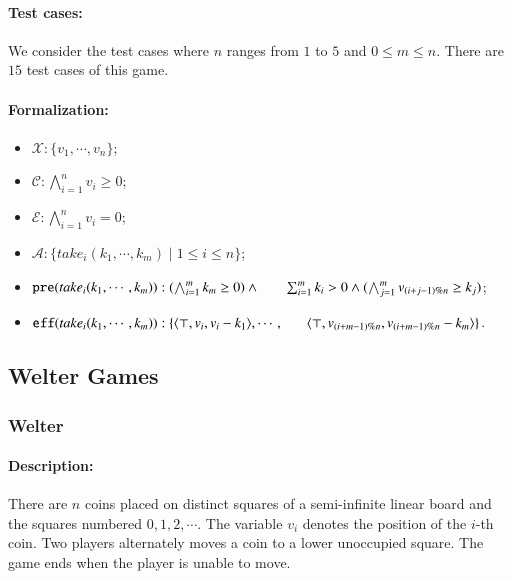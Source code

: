 \documentclass[review]{elsarticle}
\newcommand{\set}[1]{\{ #1 \}}
\newcommand{\tuple}[1]{\langle {#1} \rangle}
\newcommand{\true}{\top}
\newcommand{\statevar}{\mathcal{X}}
\newcommand{\act}{\mathcal{A}}
\newcommand{\constraint}{\mathcal{C}}
\newcommand{\estate}{\mathcal{E}}
\newcommand{\pre}{\mathtt{pre}}
\newcommand{\eff}{\mathtt{eff}}
\begin{document}
\paragraph{Test cases:}
We consider the test cases where $n$ ranges from $1$ to $5$ and $0 \le m \leq n$.
There are $15$ test cases of this game.

\paragraph{Formalization:}
\begin{itemize}
	\item $\statevar: \set{v_1, \cdots, v_n}$;
	\item $\constraint: \bigwedge_{i=1}^{n} v_i \ge 0$;
	\item $\estate: \bigwedge_{i=1}^{n} v_i = 0$;
	\item $\act:\set{take_i(k_1, \cdots, k_m) {\mid} 1 \le i \le n}$;
	\item $\pre(take_i(k_1, \cdots, k_m)) : (\bigwedge_{i=1}^{m} k_m\ge 0) \wedge \\ \hspace*{6mm}
	\sum_{i=1}^{m} k_i > 0 \wedge 
	(\bigwedge_{j=1}^{m} v_{(i+j-1)\%n}\ge k_j)$;
	\item $\eff(take_i(k_1, \cdots, k_m)) : \set{\tuple{\true, v_i, v_i - k_1},\cdots, \\\hspace*{6mm}
		\tuple{\true, v_{(i+m-1)\%n}, v_{(i+m-1)\%n} - k_m}}$.
\end{itemize}

\subsection{Welter Games}
\subsubsection{Welter \protect\cite{Wel1952}}

\paragraph{Description:} 
There are $n$ coins placed on distinct squares of a semi-infinite linear board and the squares numbered $0, 1, 2, \cdots$.
The variable $v_i$ denotes the position of the $i$-th coin.
Two players alternately moves a coin to a lower unoccupied square. 
The game ends when the player is unable to move.
\end{document}
